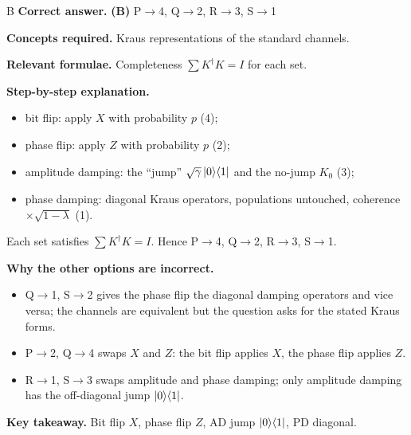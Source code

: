 \documentclass[11pt,a4paper]{article}
\newcommand{\qsep}{\par\vspace{2pt}{\color{black!15}\hrule}\vspace{4pt}}
\begin{document}
\begin{solbox}{B}
\textbf{\color{brand}Correct answer.} \textcolor{okgreen}{\textbf{(B)}} P$\to$4, Q$\to$2, R$\to$3, S$\to$1

\textbf{\color{brand}Concepts required.} Kraus representations of the standard channels.

\textbf{\color{brand}Relevant formulae.} Completeness $\sum K^\dagger K = I$ for each set.

\textbf{\color{brand}Step-by-step explanation.} \begin{itemize}\itemsep0pt
\item bit flip: apply $X$ with probability $p$ (4);
\item phase flip: apply $Z$ with probability $p$ (2);
\item amplitude damping: the ``jump'' $\sqrt\gamma\ket0\!\bra1$ and the no-jump $K_0$ (3);
\item phase damping: diagonal Kraus operators, populations untouched, coherence $\times\sqrt{1-\lambda}$ (1).
\end{itemize}
Each set satisfies $\sum K^\dagger K = I$. Hence P$\to$4, Q$\to$2, R$\to$3, S$\to$1.

\textbf{\color{brand}Why the other options are incorrect.}
\begin{itemize}[leftmargin=2.4em, itemsep=1pt, topsep=2pt]
\item[\textbf{(A)}] Q$\to$1, S$\to$2 gives the phase flip the diagonal damping operators and vice versa; the channels are equivalent but the question asks for the stated Kraus forms.
\item[\textbf{(C)}] P$\to$2, Q$\to$4 swaps $X$ and $Z$: the bit flip applies $X$, the phase flip applies $Z$.
\item[\textbf{(D)}] R$\to$1, S$\to$3 swaps amplitude and phase damping; only amplitude damping has the off-diagonal jump $\ket0\!\bra1$.
\end{itemize}
\textbf{\color{brand}Key takeaway.} Bit flip $X$, phase flip $Z$, AD jump $\ket0\!\bra1$, PD diagonal.
\end{solbox}
\qsep
\end{document}
